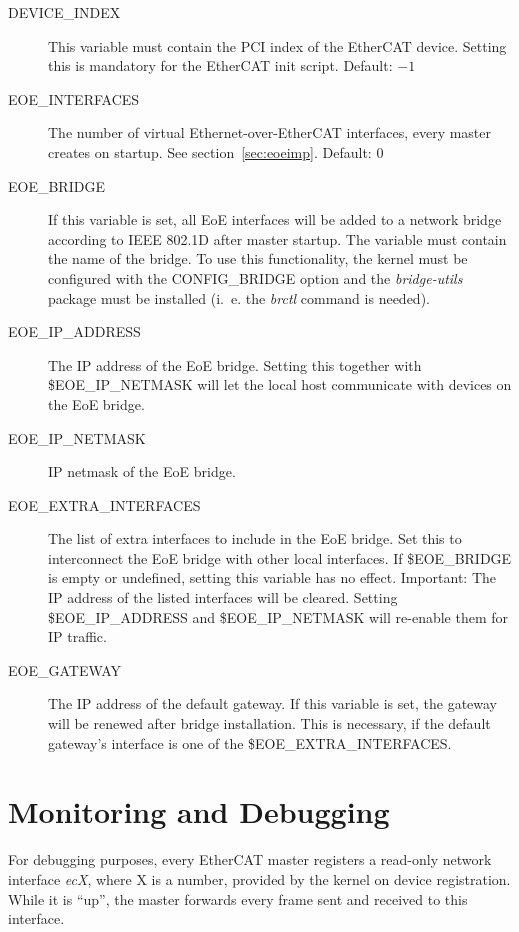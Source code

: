 \documentclass[a4paper,12pt,BCOR6mm,bibtotoc,idxtotoc]{scrbook}
\begin{document}
\begin{description}
\item[DEVICE\_INDEX] This variable must contain the PCI index of the
  EtherCAT device.  Setting this is mandatory for the EtherCAT init
  script. Default: $-1$
\item[EOE\_INTERFACES] The number of virtual Ethernet-over-EtherCAT
  interfaces, every master creates on startup. See
  section~\ref{sec:eoeimp}. Default: $0$
\item[EOE\_BRIDGE] If this variable is set, all EoE interfaces will be
  added to a network bridge according to IEEE 802.1D after master
  startup. The variable must contain the name of the bridge. To use
  this functionality, the kernel must be configured with the
  CONFIG\_BRIDGE option and the \textit{bridge-utils} package must be
  installed (i.~e. the \textit{brctl} command is needed).
\item[EOE\_IP\_ADDRESS] The IP address of the EoE bridge. Setting this
  together with \$EOE\_IP\_NETMASK will let the local host communicate
  with devices on the EoE bridge.
\item[EOE\_IP\_NETMASK] IP netmask of the EoE bridge.
\item[EOE\_EXTRA\_INTERFACES] The list of extra interfaces to include
  in the EoE brid\-ge. Set this to interconnect the EoE bridge with
  other local interfaces. If \$EOE\_\-BRIDGE is empty or undefined,
  setting this variable has no effect. Important: The IP address of
  the listed interfaces will be cleared. Setting
  \$EOE\_\-IP\_\-ADDRESS and \$EOE\_IP\_NETMASK will re-enable them
  for IP traffic.
\item[EOE\_GATEWAY] The IP address of the default gateway. If this
  variable is set, the gateway will be renewed after bridge
  installation. This is necessary, if the default gateway's interface
  is one of the \$EOE\_EXTRA\_INTERFACES.
\end{description}


\section{Monitoring and Debugging}
\label{sec:debug}

For debugging purposes, every EtherCAT master registers a read-only network
interface \textit{ecX}, where X is a number, provided by the kernel on device
registration. While it is ``up'', the master forwards every frame sent and
received to this interface.
\end{document}
